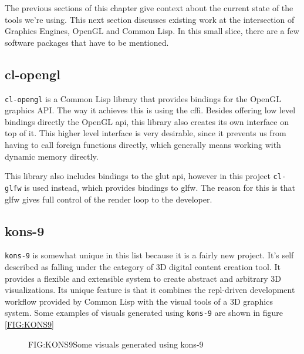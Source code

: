 
\label{SEC:SOTA}

The previous sections of this chapter give context about the current state of the tools we're using.
This next section discusses existing work at the intersection of Graphics Engines, OpenGL and Common Lisp.
In this small slice,
there are a few software packages that have to be mentioned.

\subsection{cl-opengl}

\texttt{cl-opengl}\cite{clopengl} is a Common Lisp library that provides bindings for the OpenGL graphics API.
The way it achieves this is using the \ac{cffi}.
Besides offering low level bindings directly the OpenGL \ac{api},
this library also creates its own interface on top of it.
This higher level interface is very desirable,
since it prevents us from having to call foreign functions directly,
which generally means working with dynamic memory directly\cite{cffi}.

This library also includes bindings to the \ac{glut} \ac{api},
however in this project \texttt{cl-glfw} is used instead,
which provides bindings to \ac{glfw}.
The reason for this is that \ac{glfw} gives full control of the render loop to the developer.

\subsection{kons-9}

\texttt{kons-9}\cite{kons9} is somewhat unique in this list because it is a fairly new project.
It's self described as falling under the category of 3D digital content creation tool.
It provides a flexible and extensible system to create abstract and arbitrary 3D visualizations.
Its unique feature is that it combines the \ac{repl}-driven development workflow provided by Common Lisp with the visual tools of a 3D graphics system.
Some examples of visuals generated using \texttt{kons-9} are shown in figure \ref{FIG:KONS9}

\begin{figure}[Kons-9 example]{FIG:KONS9}{Some visuals generated using kons-9}
\end{figure}

